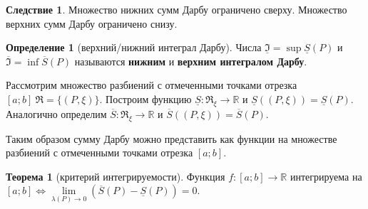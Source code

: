 \documentclass{report}
\theoremstyle{definition}
\newtheorem{definition}{Определение}[section]
\newtheorem*{effect}{Следствие}
\newtheorem{theorem}{Теорема}[section]
\begin{document}
\begin{effect}
  Множество нижних сумм Дарбу ограничено сверху. Множество верхних сумм Дарбу ограничено снизу.
\end{effect}

\begin{definition}[верхний/нижний интеграл Дарбу]
  Числа $\underline{\mathfrak{I}}=\sup\underline{S}(P)$ и $\overline{\mathfrak{I}}=\inf\overline{S}(P)$ называются
  \textbf{нижним} и \textbf{верхним интегралом Дарбу}.
\end{definition}

Рассмотрим множество разбиений с отмеченными точками отрезка $[a;b] \ \Re = \{(P,\xi)\}$. Построим функцию $\underline{S}:
  \Re_{\xi}\rightarrow\mathbb{R}$ и $\underline{S}((P,\xi)) = \underline{S}(P)$. Аналогично определим $\overline{S}:
  \Re_{\xi}\rightarrow\mathbb{R}$ и $\overline{S}((P,\xi)) = \overline{S}(P)$.

Таким образом сумму Дарбу можно представить как функции на множестве разбиений с отмеченными точками отрезка $[a;b]$.

\begin{theorem}[критерий интегрируемости]
  Функция $f:[a;b]\rightarrow\mathbb{R}$ интегрируема на $[a;b] \iff \underset{\lambda (P)\rightarrow0}{\lim}
    (\overline{S}(P) - \underline{S}(P)) = 0$.
\end{theorem}
\end{document}
